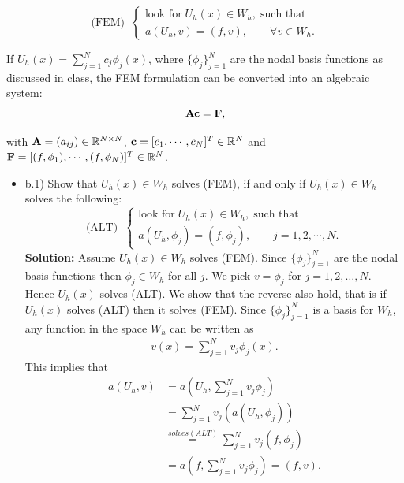 \documentclass[11pt]{article}      %
\begin{document}
\begin{enumerate}
\begin{enumerate}
\begin{displaymath}
{\textrm{(FEM)}} \;\;\left\{
\begin{array}{l}
\mbox{look for} \; U_h(x)\in W_h, \; \mbox{such that}\\
a(U_h, v)=(f, v),\qquad \forall v\in W_h.
\end{array}
\right.
\end{displaymath}

If $U_h(x)=\sum_{j=1}^{N} c_j\phi_j(x)$, where $\{\phi_j\}_{j=1}^N$ are the nodal basis functions as discussed in class,  the FEM formulation can be converted into an  algebraic system:
\begin{equation}
\label{eq:1}
{\bf A c}={\bf F},
\end{equation}
%

with ${\bf A}=(a_{ij})\in{\mathbb R}^{N\times N}$, ${\bf c}=[c_1, \cdots, c_{N}]^T\in{\mathbb R}^N$ and ${\bf F}=[(f, \phi_1), \cdots, (f, \phi_N)]^T\in{\mathbb R}^N$.

\begin{itemize}
%
\item[]b.1) Show that $U_h(x)\in W_h$ solves (FEM), if and only if $U_h(x)\in W_h$ solves the following:
\begin{displaymath}
{\textrm{(ALT)}} \;\;\left\{
\begin{array}{l}
\mbox{look for} \; U_h(x)\in W_h, \; \mbox{such that}\\
a(U_h, \phi_j)=(f, \phi_j),\qquad j=1, 2, \cdots, N.
\end{array}
\right.
\end{displaymath}
{\bf Solution:}
Assume $U_h(x) \in W_h$ solves (FEM). Since $\{\phi_j\}_{j=1}^N$ are the nodal basis functions then $\phi_j \in W_h$ for all $j$. We pick $v=\phi_j$ for $j=1,2,\ldots,N$. Hence $U_h(x)$ solves (ALT). We show that the reverse also hold, that is if $U_h(x)$ solves (ALT) then it solves (FEM). Since $\{\phi_j\}_{j=1}^N$ is a basis for $W_h$, any function in the space $W_h$ can be written as 
\begin{align*}
	v(x) =\sum_{j=1}^{N} v_j\phi_j(x) .
\end{align*} 
This implies that
\begin{align*}
	a(U_h,v) &= a(U_h,\sum_{j=1}^{N} v_j\phi_j)\\
	 &= \sum_{j=1}^{N} v_j(a(U_h,\phi_j))\\
	&\overset{solves (ALT)}{=} \sum_{j=1}^{N} v_j(f,\phi_j)\\ 
	&= a(f,\sum_{j=1}^{N} v_j\phi_j) = (f,v).
\end{align*}


\end{itemize}
\end{enumerate}
\end{enumerate}
\end{document}

